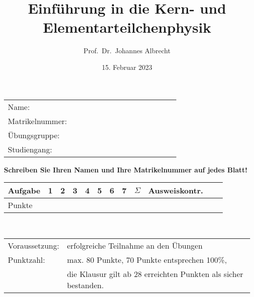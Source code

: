 \documentclass[11pt,a4paper,headings=standardclasses]{scrartcl}
\begin{document}
  \begin{titlepage}
    \titlehead{\Large TU Dortmund \hfill WS~2022/23}
    \subject{Klausur}
    \title{Einführung in die Kern- und Elementarteilchenphysik}
    \author{Prof.~Dr.~Johannes Albrecht}
    \date{15. Februar 2023}
    \maketitle
    {
      \thispagestyle{empty}
      \centering
      \large
      \begin{tabular}{lp{0.7\linewidth}}
        Name:           & \dotfill \\[1em]
        Matrikelnummer: & \dotfill \\[1em]
        Übungsgruppe:   & \dotfill \\[1em]
        Studiengang:    & \dotfill \\[1em]
      \end{tabular}
      \textbf{Schreiben Sie Ihren Namen und Ihre Matrikelnummer auf jedes Blatt!} \\[8mm]
      {
        \large
        \begin{tabular}{|l|c|c|c|c|c|c|c|c|c|c|c|}
          \hline
          Aufgabe & 1 & 2 & 3 & 4 & 5 & 6 & 7 & $\Sigma$& Ausweiskontr.
          \parbox[0pt][2em][c]{0cm}{} \\
          \hline
          Punkte & \hspace*{0.05\linewidth}
                 & \hspace*{0.05\linewidth}
                 & \hspace*{0.05\linewidth}
                 & \hspace*{0.05\linewidth}
                 & \hspace*{0.05\linewidth}
                 & \hspace*{0.05\linewidth}
                 & \hspace*{0.05\linewidth}
                 & \hspace*{0.05\linewidth}
                 & \parbox[0pt][2em][c]{0cm}{} \\
          \hline
        \end{tabular}
      } \\[1em]
      \begin{tabular}{ll}
        Voraussetzung: & erfolgreiche Teilnahme an den Übungen \\
        Punktzahl:     & max. 80 Punkte, 70 Punkte entsprechen 100\%, \\
                       & die Klausur gilt ab 28 erreichten Punkten als sicher bestanden. \\

\end{tabular}}
\end{titlepage}
\end{document}
